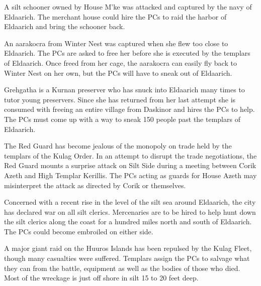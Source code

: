 {
	\item A silt schooner owned by House M’ke was attacked and captured by the navy of Eldaarich. The merchant house could hire the PCs to raid the harbor of Eldaarich and bring the schooner back.
	\item An aarakocra from Winter Nest was captured when she flew too close to Eldaarich. The PCs are asked to free her before she is executed by the templars of Eldaarich. Once freed from her cage, the aarakocra can easily fly back to Winter Nest on her own, but the PCs will have to sneak out of Eldaarich.
	\item Grehgatha is a Kurnan preserver who has snuck into Eldaarich many times to tutor young preservers. Since she has returned from her last attempt she is consumed with freeing an entire village from Daskinor and hires the PCs to help. The PCs must come up with a way to sneak 150 people past the templars of Eldaarich.
	\item The Red Guard has become jealous of the monopoly on trade held by the templars of the Kulag Order. In an attempt to disrupt the trade negotiations, the Red Guard mounts a surprise attack on Silt Side during a meeting between Corik Azeth and High Templar Kerillis. The PCs acting as guards for House Azeth may misinterpret the attack as directed by Corik or themselves.
	\item Concerned with a recent rise in the level of the silt sea around Eldaarich, the city has declared war on all silt clerics. Mercenaries are to be hired to help hunt down the silt clerics along the coast for a hundred miles north and south of Eldaarich. The PCs could become embroiled on either side.
	\item A major giant raid on the Huuros Islands has been repulsed by the Kulag Fleet, though many casualties were suffered. Templars assign the PCs to salvage what they can from the battle, equipment as well as the bodies of those who died. Most of the wreckage is just off shore in silt 15 to 20 feet deep.
}